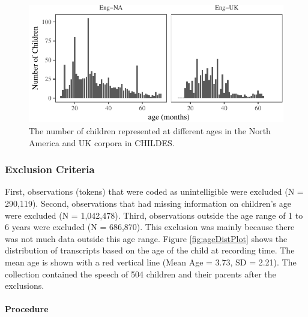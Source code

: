 \documentclass[floatsintext,man]{apa6}
\theoremstyle{definition}
\theoremstyle{definition}
\theoremstyle{definition}
\theoremstyle{remark}
\begin{document}
\begin{figure}[tb]

{\centering \includegraphics{figs/childDensityPlot-1} 

}

\caption{The number of children represented at different ages in the North America and UK corpora in CHILDES.}\label{fig:childDensityPlot}
\end{figure}

\subsubsection{Exclusion Criteria}\label{exclusion-criteria}

First, observations (tokens) that were coded as unintelligible were
excluded (N = 290,119). Second, observations that had missing
information on children's age were excluded (N = 1,042,478). Third,
observations outside the age range of 1 to 6 years were excluded (N =
686,870). This exclusion was mainly because there was not much data
outside this age range. Figure \ref{fig:ageDistPlot} shows the
distribution of transcripts based on the age of the child at recording
time. The mean age is shown with a red vertical line (Mean Age = 3.73,
SD = 2.21). The collection contained the speech of 504 children and
their parents after the exclusions.

\paragraph{Procedure}\label{procedure}
\end{document}
